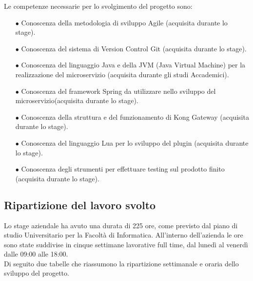Le competenze necessarie per lo svolgimento del progetto sono:
\begin{itemize}
	\item[$\bullet$]Conoscenza della metodologia di sviluppo Agile (acquisita durante lo stage).
	\item[$\bullet$]Conoscenza del sistema di Version Control Git (acquisita durante lo stage).
	\item[$\bullet$]Conoscenza del linguaggio Java e della JVM (Java Virtual Machine) per la realizzazione del microservizio (acquisita durante gli studi Accademici).
	\item[$\bullet$]Conoscenza del framework Spring da utilizzare nello sviluppo del microservizio(acquisita durante lo stage).
	\item[$\bullet$]Conoscenza della struttura e del funzionamento di Kong Gateway (acquisita durante lo stage).
	\item[$\bullet$]Conoscenza del linguaggio Lua per lo sviluppo del plugin (acquisita durante lo stage).
	\item[$\bullet$]Conoscenza degli strumenti per effettuare testing sul prodotto finito (acquisita durante lo stage).
\end{itemize}

\subsection{Ripartizione del lavoro svolto}\label{sec:ripartizionelavoro}
Lo stage aziendale ha avuto una durata di 225 ore, come previsto dal piano di studio Universitario per la Facoltà di Informatica. All'interno dell'azienda le ore sono state suddivise in cinque settimane lavorative full time, dal lunedì al venerdì dalle 09:00 alle 18:00.\\
Di seguito due tabelle che riassumono la ripartizione settimanale e oraria dello sviluppo del progetto.\\

